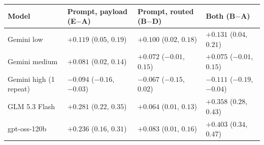 \begin{tabularx}{\linewidth}{lYYY}
\toprule
Model & Prompt, payload (E$-$A) & Prompt, routed (B$-$D) & Both (B$-$A) \\
\midrule
Gemini low & $+0.119$ ($0.05$, $0.19$) & $+0.100$ ($0.02$, $0.18$) & $+0.131$ ($0.04$, $0.21$) \\
Gemini medium & $+0.081$ ($0.02$, $0.14$) & $+0.072$ ($-0.01$, $0.15$) & $+0.075$ ($-0.01$, $0.15$) \\
Gemini high (1 repeat) & $-0.094$ ($-0.16$, $-0.03$) & $-0.067$ ($-0.15$, $0.02$) & $-0.111$ ($-0.19$, $-0.04$) \\
GLM 5.3 Flash & $+0.281$ ($0.22$, $0.35$) & $+0.064$ ($0.01$, $0.13$) & $+0.358$ ($0.28$, $0.43$) \\
gpt-oss-120b & $+0.236$ ($0.16$, $0.31$) & $+0.083$ ($0.01$, $0.16$) & $+0.403$ ($0.34$, $0.47$) \\
\bottomrule
\end{tabularx}
